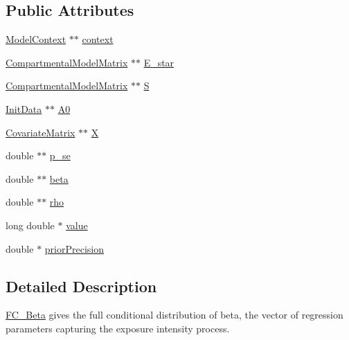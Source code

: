 \subsection*{Public Attributes}
\begin{DoxyCompactItemize}
\item 
\hyperlink{classSpatialSEIR_1_1ModelContext}{Model\-Context} $\ast$$\ast$ \hyperlink{classSpatialSEIR_1_1FC__Beta_abb49ac278509d42f38389f318fd372a7}{context}
\item 
\hyperlink{classSpatialSEIR_1_1CompartmentalModelMatrix}{Compartmental\-Model\-Matrix} $\ast$$\ast$ \hyperlink{classSpatialSEIR_1_1FC__Beta_a820c829d4e372e85b3afe3dbe1f9630f}{E\-\_\-star}
\item 
\hyperlink{classSpatialSEIR_1_1CompartmentalModelMatrix}{Compartmental\-Model\-Matrix} $\ast$$\ast$ \hyperlink{classSpatialSEIR_1_1FC__Beta_aaa946617743ffad43b73f7533c7fb6b5}{S}
\item 
\hyperlink{classSpatialSEIR_1_1InitData}{Init\-Data} $\ast$$\ast$ \hyperlink{classSpatialSEIR_1_1FC__Beta_aa17a045f03d452edba2242b3c2726e56}{A0}
\item 
\hyperlink{classSpatialSEIR_1_1CovariateMatrix}{Covariate\-Matrix} $\ast$$\ast$ \hyperlink{classSpatialSEIR_1_1FC__Beta_a3619f98f776ef5ab826350177e2f1326}{X}
\item 
double $\ast$$\ast$ \hyperlink{classSpatialSEIR_1_1FC__Beta_a6578a67debe1dbe47fff2f6c42ef865f}{p\-\_\-se}
\item 
double $\ast$$\ast$ \hyperlink{classSpatialSEIR_1_1FC__Beta_ad7d2994afbea485bb85f48901fda323f}{beta}
\item 
double $\ast$$\ast$ \hyperlink{classSpatialSEIR_1_1FC__Beta_a45c63ad745b312f58fba322223f78bbe}{rho}
\item 
long double $\ast$ \hyperlink{classSpatialSEIR_1_1FC__Beta_aae2fb964cd80bfa9eba448f2075640d5}{value}
\item 
double $\ast$ \hyperlink{classSpatialSEIR_1_1FC__Beta_a5f56c94d34e77cd4a331dfdcb169373e}{prior\-Precision}
\end{DoxyCompactItemize}


\subsection{Detailed Description}
\hyperlink{classSpatialSEIR_1_1FC__Beta}{F\-C\-\_\-\-Beta} gives the full conditional distribution of beta, the vector of regression parameters capturing the exposure intensity process. 

